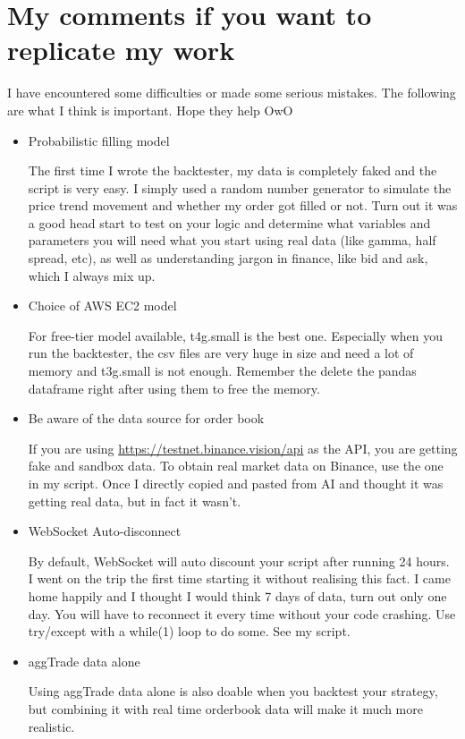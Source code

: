 \documentclass[11pt,a4paper]{article}
\begin{document}
\section{My comments if you want to replicate my work}
I have encountered some difficulties or made some serious mistakes. The following are what I think is important. Hope they help OwO
\begin{itemize}
    \item Probabilistic filling model 
    
    The first time I wrote the backtester, my data is completely faked and the script is very easy. I simply used a random number generator to simulate the price trend movement and whether my order got filled or not. Turn out it was a good head start to test on your logic and determine what variables and parameters you will need what you start using real data (like gamma, half spread, etc), as well as understanding jargon in finance, like bid and ask, which I always mix up.
    
    \item Choice of AWS EC2 model

    For free-tier model available, t4g.small is the best one. Especially when you run the backtester, the csv files are very huge in size and need a lot of memory and t3g.small is not enough. Remember the delete the pandas dataframe right after using them to free the memory.

    \item Be aware of the data source for order book

    If you are using \url{https://testnet.binance.vision/api} as the API, you are getting fake and sandbox data. To obtain real market data on Binance, use the one in my script. Once I directly copied and pasted from AI and thought it was getting real data, but in fact it wasn't. 

    \item WebSocket Auto-disconnect

    By default, WebSocket will auto discount your script after running 24 hours. I went on the trip the first time starting it without realising this fact. I came home happily and I thought I would think 7 days of data, turn out only one day. You will have to reconnect it every time without your code crashing. Use try/except with a while(1) loop to do some. See my script.

    \item aggTrade data alone

    Using aggTrade data alone is also doable when you backtest your strategy, but combining it with real time orderbook data will make it much more realistic.


\end{itemize}
\end{document}
